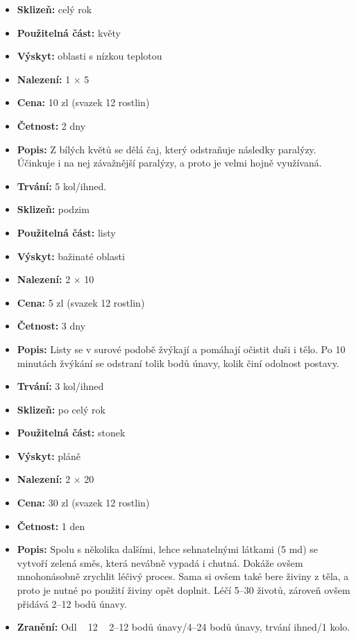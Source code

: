 \documentclass[../main.tex]{subfiles}
\begin{document}
\begin{predmet}
\begin{itemize}
	\item \textbf{Sklizeň:} celý rok
	\item \textbf{Použitelná část:} květy
	\item \textbf{Výskyt:} oblasti s nízkou teplotou
	\item \textbf{Nalezení:} 1 × 5
	\item \textbf{Cena:} 10 zl (svazek 12 rostlin)
	\item \textbf{Četnost:} 2 dny
	\item \textbf{Popis:} Z bílých květů se dělá čaj, který odstraňuje následky paralýzy. Účinkuje i na nej závažnější paralýzy, a proto je velmi hojně využívaná.
	\item \textbf{Trvání:} 5 kol/ihned.
\end{itemize}
\end{predmet}

\begin{predmet}[Blatan]
\begin{itemize}
	\item \textbf{Sklizeň:} podzim
	\item \textbf{Použitelná část:} listy
	\item \textbf{Výskyt:} bažinaté oblasti
	\item \textbf{Nalezení:} 2 × 10
	\item \textbf{Cena:} 5 zl (svazek 12 rostlin)
	\item \textbf{Četnost:} 3 dny
	\item \textbf{Popis:} Listy se v surové podobě žvýkají a pomáhají očistit duši i tělo. Po 10 minutách žvýkání se odstraní tolik bodů únavy, kolik činí odolnost postavy.
	\item \textbf{Trvání:} 3 kol/ihned
\end{itemize}
\end{predmet}

\begin{predmet}[Fiwari]
\begin{itemize}
	\item \textbf{Sklizeň:} po celý rok
	\item \textbf{Použitelná část:} stonek
	\item \textbf{Výskyt:} pláně
	\item \textbf{Nalezení:} 2 × 20
	\item \textbf{Cena:} 30 zl (svazek 12 rostlin)
	\item \textbf{Četnost:} 1 den
	\item \textbf{Popis:} Spolu s několika dalšími, lehce sehnatelnými látkami (5 md) se vytvoří zelená směs, která nevábně vypadá i chutná. Dokáže ovšem mnohonásobně zrychlit léčivý proces. Sama si ovšem také bere živiny z těla, a proto je nutné po použití živiny opět doplnit. Léčí 5–30 životů, zároveň ovšem přidává 2–12 bodů únavy.
	\item \textbf{Zranění:} Odl ~ 12 ~ 2–12 bodů únavy/4–24 bodů únavy, trvání ihned/1 kolo.
\end{itemize}
\end{predmet}
\end{document}
